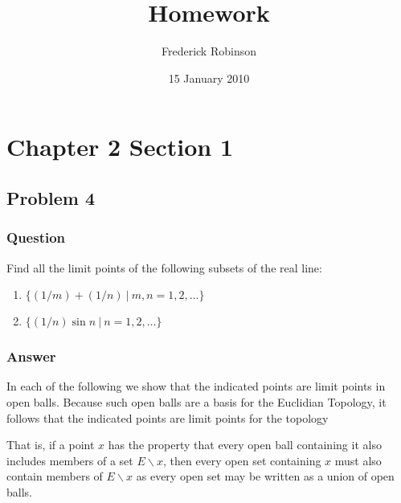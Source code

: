 \documentclass[10pt]{article}
\title{Homework}
\author{Frederick Robinson}
\date{15 January 2010}
\begin{document}

   \maketitle



\section{Chapter 2 Section 1}

\subsection{Problem 4}

\subsubsection{Question}
Find all the limit points of the following subsets of the real line:
\begin{enumerate}
\item $\{(1/m)+(1/n)\ |\ m,n=1,2,\dots\}$
\item $\{(1/n) \sin{n}\ |\ n = 1,2,\dots\}$
\end{enumerate}

\subsubsection{Answer}
In each of the following we show that the indicated points are limit points in open balls. Because such open balls are a basis for the Euclidian Topology, it follows that the indicated points are limit points for the topology

That is, if a point $x$ has the property that every open ball containing it also includes members of a set $E\backslash x$, then every open set containing $x$ must also contain members of $E \backslash x$ as every open set may be written as a union of open balls.
\end{document}
